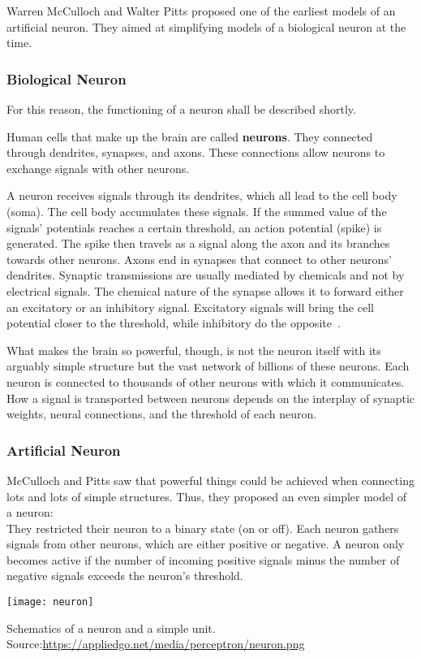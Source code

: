 Warren McCulloch and Walter Pitts proposed one of the earliest models of an artificial neuron.
They aimed at simplifying models of a biological neuron at the time.

\subsubsection{Biological Neuron}
For this reason, the functioning of a neuron shall be described shortly.

Human cells that make up the brain are called \textbf{neurons}.
They connected through dendrites, synapses, and axons.
These connections allow neurons to exchange signals with other neurons.

A neuron receives signals through its dendrites, which all lead to the cell body (soma).
The cell body accumulates these signals.
If the summed value of the signals' potentials reaches a certain threshold, an action potential (spike) is generated.
The spike then travels as a signal along the axon and its branches towards other neurons.
Axons end in synapses that connect to other neurons' dendrites.
Synaptic transmissions are usually mediated by chemicals and not by electrical signals.
The chemical nature of the synapse allows it to forward either an excitatory or an inhibitory signal.
Excitatory signals will bring the cell potential closer to the threshold, while inhibitory do the opposite~\cite[p.~42]{coloratlas}.

What makes the brain so powerful, though, is not the neuron itself with its arguably simple structure but the vast network of billions of these neurons.
Each neuron is connected to thousands of other neurons with which it communicates.
How a signal is transported between neurons depends on the interplay of synaptic weights, neural connections, and the threshold of each neuron.

\subsubsection{Artificial Neuron}
McCulloch and Pitts saw that powerful things could be achieved when connecting lots and lots of simple structures.
Thus, they proposed an even simpler model of a neuron: \\
They restricted their neuron to a binary state (on or off).
Each neuron gathers signals from other neurons, which are either positive or negative.
A neuron only becomes active if the number of incoming positive signals minus the number of negative signals exceeds the neuron's threshold.
\begin{marginfigure}
    \texttt{[image: neuron]}
    \caption[]{Schematics of a neuron and a simple unit. Source:\url{https://appliedgo.net/media/perceptron/neuron.png}}
\end{marginfigure}

